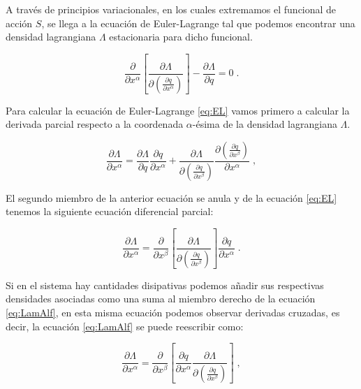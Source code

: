         A  través de principios variacionales, en los cuales extremamos el funcional  de acción $S$, se llega a la ecuación de Euler-Lagrange tal que podemos encontrar una densidad lagrangiana $\Lambda$ estacionaria para dicho funcional.

        \begin{equation}\label{eq:EL}
            \frac{\partial}{\partial x^{\alpha}}\left[\frac{\partial \Lambda}{\partial \left(\frac{\partial q}{\partial x^{\alpha}} \right)} \right] - \frac{\partial \Lambda}{\partial q} = 0 \; .
        \end{equation}

        Para calcular la ecuación de Euler-Lagrange \ref{eq:EL} vamos primero a calcular la derivada parcial respecto a la coordenada $\alpha$-ésima de la densidad lagrangiana $\Lambda$.

        \begin{equation*}
            \frac{\partial \Lambda}{\partial x^{\alpha}} = \frac{\partial \Lambda}{\partial q}\frac{\partial q}{\partial x^{\alpha}} + \frac{\partial \Lambda}{\partial \left(\frac{\partial q}{\partial x^{\beta}}\right)}\frac{\partial \left(\frac{\partial q}{\partial x^{\beta}} \right)}{\partial x^{\alpha}} \; ,
        \end{equation*}

        El segundo miembro de la anterior ecuación se anula y de la ecuación \ref{eq:EL} tenemos la siguiente ecuación diferencial parcial:

        \begin{equation}\label{eq:LamAlf}
            \frac{\partial \Lambda}{\partial x^{\alpha}} = \frac{\partial}{\partial x^{\beta}}\left[\frac{\partial \Lambda}{\partial \left(\frac{\partial q}{\partial x^{\beta}} \right)} \right]\frac{\partial q}{\partial x^{\alpha}} \; .
        \end{equation}

        Si en el sistema hay cantidades disipativas  podemos añadir sus respectivas densidades asociadas como una suma al miembro derecho de la ecuación \ref{eq:LamAlf}, en esta misma ecuación podemos observar derivadas cruzadas, es decir, la ecuación \ref{eq:LamAlf} se puede reescribir como:

        \begin{equation}
            \frac{\partial \Lambda}{\partial x^{\alpha}} = \frac{\partial}{\partial x^{\beta}}\left[\frac{\partial q}{\partial x^{\alpha}}\frac{\partial \Lambda}{\partial \left(\frac{\partial q}{\partial x^{\beta}} \right)} \right] \; ,
        \end{equation}

